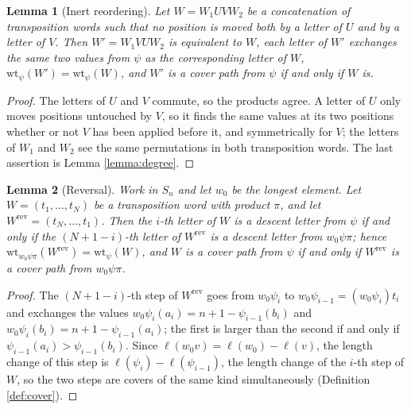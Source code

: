 \documentclass{amsart}
\newtheorem{lemma}{Lemma}[section]
\theoremstyle{definition}
\theoremstyle{remark}
\numberwithin{equation}{section}
\begin{document}
\begin{lemma}[Inert reordering] \label{lemma:inert}
Let $W=W_1UVW_2$ be a concatenation of transposition words such that no position is moved both by a letter of $U$ and by a letter of $V$. Then $W'=W_1VUW_2$ is equivalent to $W$, each letter of $W'$ exchanges the same two values from $\psi$ as the corresponding letter of $W$, $\mathrm{wt}_\psi(W')=\mathrm{wt}_\psi(W)$, and $W'$ is a cover path from $\psi$ if and only if $W$ is.
\end{lemma}
\begin{proof}
The letters of $U$ and $V$ commute, so the products agree. A letter of $U$ only moves positions untouched by $V$, so it finds the same values at its two positions whether or not $V$ has been applied before it, and symmetrically for $V$; the letters of $W_1$ and $W_2$ see the same permutations in both transposition words. The last assertion is Lemma \ref{lemma:degree}.
\end{proof}

\begin{lemma}[Reversal] \label{lemma:reversal}
Work in $S_n$ and let $w_0$ be the longest element. Let $W=(t_1,\ldots,t_N)$ be a transposition word with product $\pi$, and let $W^{\mathrm{rev}}=(t_N,\ldots,t_1)$. Then the $i$-th letter of $W$ is a descent letter from $\psi$ if and only if the $(N+1-i)$-th letter of $W^{\mathrm{rev}}$ is a descent letter from $w_0\psi\pi$; hence $\mathrm{wt}_{w_0\psi\pi}(W^{\mathrm{rev}})=\mathrm{wt}_\psi(W)$, and $W$ is a cover path from $\psi$ if and only if $W^{\mathrm{rev}}$ is a cover path from $w_0\psi\pi$.
\end{lemma}
\begin{proof}
The $(N+1-i)$-th step of $W^{\mathrm{rev}}$ goes from $w_0\psi_i$ to $w_0\psi_{i-1}=(w_0\psi_i)t_i$ and exchanges the values $w_0\psi_i(a_i)=n+1-\psi_{i-1}(b_i)$ and $w_0\psi_i(b_i)=n+1-\psi_{i-1}(a_i)$; the first is larger than the second if and only if $\psi_{i-1}(a_i)>\psi_{i-1}(b_i)$. Since $\ell(w_0v)=\ell(w_0)-\ell(v)$, the length change of this step is $\ell(\psi_i)-\ell(\psi_{i-1})$, the length change of the $i$-th step of $W$, so the two steps are covers of the same kind simultaneously (Definition \ref{def:cover}).
\end{proof}
\end{document}
